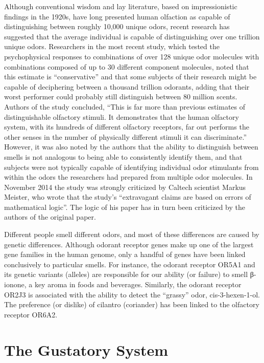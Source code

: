 Although conventional wisdom and lay literature, based on impressionistic findings in the 1920s, have long presented human olfaction as capable of distinguishing between roughly 10,000 unique odors, recent research has suggested that the average individual is capable of distinguishing over one trillion unique odors. Researchers in the most recent study, which tested the psychophysical responses to combinations of over 128 unique odor molecules with combinations composed of up to 30 different component molecules, noted that this estimate is ``conservative'' and that some subjects of their research might be capable of deciphering between a thousand trillion odorants, adding that their worst performer could probably still distinguish between 80 million scents. Authors of the study concluded, ``This is far more than previous estimates of distinguishable olfactory stimuli. It demonstrates that the human olfactory system, with its hundreds of different olfactory receptors, far out performs the other senses in the number of physically different stimuli it can discriminate.'' However, it was also noted by the authors that the ability to distinguish between smells is not analogous to being able to consistently identify them, and that subjects were not typically capable of identifying individual odor stimulants from within the odors the researchers had prepared from multiple odor molecules. In November 2014 the study was strongly criticized by Caltech scientist Markus Meister, who wrote that the study's ``extravagant claims are based on errors of mathematical logic''. The logic of his paper has in turn been criticized by the authors of the original paper.

Different people smell different odors, and most of these differences are caused by genetic differences. Although odorant receptor genes make up one of the largest gene families in the human genome, only a handful of genes have been linked conclusively to particular smells. For instance, the odorant receptor OR5A1 and its genetic variants (alleles) are responsible for our ability (or failure) to smell β-ionone, a key aroma in foods and beverages. Similarly, the odorant receptor OR2J3 is associated with the ability to detect the ``grassy'' odor, cis-3-hexen-1-ol. The preference (or dislike) of cilantro (coriander) has been linked to the olfactory receptor OR6A2.

\hypertarget{the-gustatory-system}{%
\chapter{The Gustatory System}\label{the-gustatory-system}}

